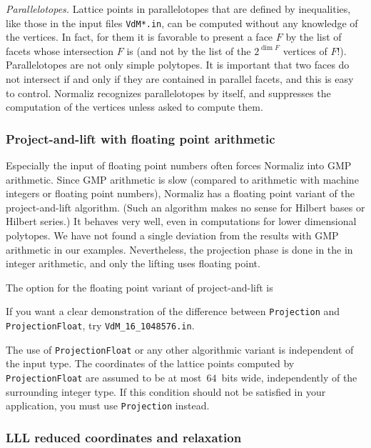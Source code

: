 \emph{Parallelotopes.}\enspace
Lattice points in parallelotopes that are defined by inequalities, like those in the input files \verb|VdM*.in|, can be computed without any knowledge of the vertices. In fact, for them it is favorable to present a face $F$ by the list of facets whose intersection $F$ is (and not by the list of the $2^{\dim F}$ vertices of $F$!). Parallelotopes are not only simple polytopes. It is important that two faces do not intersect if and only if they are contained in parallel facets, and this is easy to control. Normaliz recognizes parallelotopes by itself, and suppresses the computation of the vertices unless asked to compute them.

\subsubsection{Project-and-lift with floating point arithmetic}

Especially the input of floating point numbers often forces Normaliz into GMP arithmetic. Since GMP arithmetic is slow (compared to arithmetic with machine integers or floating point numbers), Normaliz has a floating point variant of the project-and-lift algorithm. (Such an algorithm makes no sense for Hilbert bases or Hilbert series.) It behaves very well, even in computations for lower dimensional polytopes. We have not found a single deviation from the results with GMP arithmetic in our examples. Nevertheless, the projection phase is done in the in integer arithmetic, and only the lifting uses floating point.

The option for the floating point variant of project-and-lift is
\begin{itemize}
	\itemtt [ProjectionFloat, -J]
\end{itemize}
If you want a clear demonstration of the difference between \verb|Projection| and \verb|ProjectionFloat|, try \verb|VdM_16_1048576.in|.

The use of \verb|ProjectionFloat| or any other algorithmic variant is independent of the input type. The coordinates of the lattice points computed by \verb|ProjectionFloat| are assumed to be at most~$64$~bits wide, independently of the surrounding integer type. If this condition should not be satisfied in your application, you must use \verb|Projection| instead.

\subsubsection{LLL reduced coordinates and relaxation}\label{LLL}

